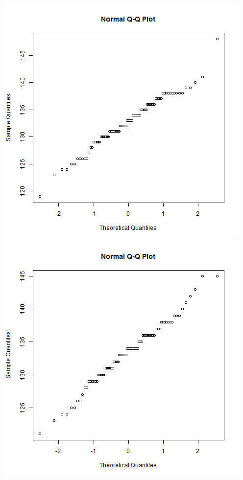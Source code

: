 \documentclass[letterpaper,10pt]{article}
\begin{document}
\begin{description}
\begin{center}
\includegraphics[scale=.25]{QQMaxB.png}
\includegraphics[scale=.25]{QQBasH.png}

\end{center}
\end{description}
\end{document}
